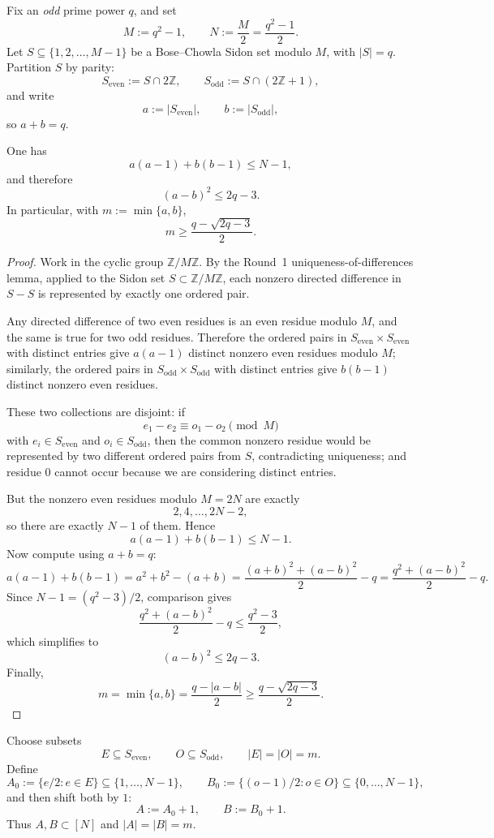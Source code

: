 Fix an \emph{odd} prime power $q$, and set
\[
M:=q^2-1,\qquad N:=\frac{M}{2}=\frac{q^2-1}{2}.
\]
Let $S\subseteq\{1,2,\dots,M-1\}$ be a Bose--Chowla Sidon set modulo $M$, with $|S|=q$.
Partition $S$ by parity:
\[
S_{\mathrm{even}}:=S\cap 2\mathbb Z,\qquad S_{\mathrm{odd}}:=S\cap(2\mathbb Z+1),
\]
and write
\[
a:=|S_{\mathrm{even}}|,\qquad b:=|S_{\mathrm{odd}}|,
\]
so $a+b=q$.

\begin{lemma}\label{lem:parity-count}
One has
\[
a(a-1)+b(b-1)\le N-1,
\]
and therefore
\[
(a-b)^2\le 2q-3.
\]
In particular, with $m:=\min\{a,b\}$,
\[
m\ge \frac{q-\sqrt{2q-3}}{2}.
\]
\end{lemma}

\begin{proof}
Work in the cyclic group $\mathbb Z/M\mathbb Z$.  By the Round~1 uniqueness-of-differences lemma, applied to the Sidon set $S\subset \mathbb Z/M\mathbb Z$, each nonzero directed difference in $S-S$ is represented by exactly one ordered pair.

Any directed difference of two even residues is an even residue modulo $M$, and the same is true for two odd residues.  Therefore the ordered pairs in $S_{\mathrm{even}}\times S_{\mathrm{even}}$ with distinct entries give $a(a-1)$ distinct nonzero even residues modulo $M$; similarly, the ordered pairs in $S_{\mathrm{odd}}\times S_{\mathrm{odd}}$ with distinct entries give $b(b-1)$ distinct nonzero even residues.

These two collections are disjoint: if
\[
e_1-e_2\equiv o_1-o_2\pmod M
\]
with $e_i\in S_{\mathrm{even}}$ and $o_i\in S_{\mathrm{odd}}$, then the common nonzero residue would be represented by two different ordered pairs from $S$, contradicting uniqueness; and residue $0$ cannot occur because we are considering distinct entries.

But the nonzero even residues modulo $M=2N$ are exactly
\[
2,4,\dots,2N-2,
\]
so there are exactly $N-1$ of them.  Hence
\[
a(a-1)+b(b-1)\le N-1.
\]
Now compute using $a+b=q$:
\[
a(a-1)+b(b-1)=a^2+b^2-(a+b)=\frac{(a+b)^2+(a-b)^2}{2}-q
=\frac{q^2+(a-b)^2}{2}-q.
\]
Since $N-1=(q^2-3)/2$, comparison gives
\[
\frac{q^2+(a-b)^2}{2}-q\le \frac{q^2-3}{2},
\]
which simplifies to
\[
(a-b)^2\le 2q-3.
\]
Finally,
\[
m=\min\{a,b\}=\frac{q-|a-b|}{2}\ge \frac{q-\sqrt{2q-3}}{2}.
\]
\end{proof}

Choose subsets
\[
E\subseteq S_{\mathrm{even}},\qquad O\subseteq S_{\mathrm{odd}},\qquad |E|=|O|=m.
\]
Define
\[
A_0:=\{e/2:e\in E\}\subseteq\{1,\dots,N-1\},
\qquad
B_0:=\{(o-1)/2:o\in O\}\subseteq\{0,\dots,N-1\},
\]
and then shift both by $1$:
\[
A:=A_0+1,\qquad B:=B_0+1.
\]
Thus $A,B\subset[N]$ and $|A|=|B|=m$.

